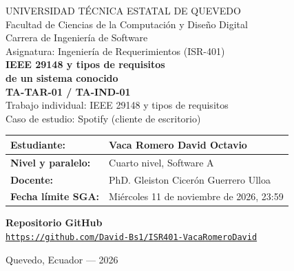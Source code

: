 \documentclass[11pt,a4paper]{article}
\begin{document}
\begin{center}
{\large UNIVERSIDAD T\'ECNICA ESTATAL DE QUEVEDO}\\[6pt]
{\normalsize Facultad de Ciencias de la Computaci\'on y Dise\~no Digital}\\[3pt]
{\normalsize Carrera de Ingenier\'ia de Software}\\[14pt]
{\normalsize Asignatura: Ingenier\'ia de Requerimientos (ISR-401)}\\[42pt]
{\LARGE\bfseries IEEE 29148 y tipos de requisitos\\[4pt] de un sistema conocido}\\[14pt]
{\large\bfseries TA-TAR-01 / TA-IND-01}\\[14pt]
{\normalsize Trabajo individual: IEEE 29148 y tipos de requisitos}\\[8pt]
{\normalsize Caso de estudio: Spotify (cliente de escritorio)}
\end{center}
\vspace{1.4cm}
\begin{tabularx}{\textwidth}{|>{\bfseries}p{4.5cm}|X|}\hline
Estudiante: & Vaca Romero David Octavio \\ \hline
Nivel y paralelo: & Cuarto nivel, Software A \\ \hline
Docente: & PhD. Gleiston Cicer\'on Guerrero Ulloa \\ \hline
Fecha l\'imite SGA: & Mi\'ercoles 11 de noviembre de 2026, 23:59 \\ \hline
\end{tabularx}
\vspace{1.3cm}
\begin{center}
{\bfseries Repositorio GitHub}\\[12pt]
\mbox{\href{https://github.com/David-Bs1/ISR401-VacaRomeroDavid}{\small\texttt{https://github.com/David-Bs1/ISR401-VacaRomeroDavid}}}
\end{center}
\vfill
\begin{center}
Quevedo, Ecuador --- 2026
\end{center}
\end{document}

